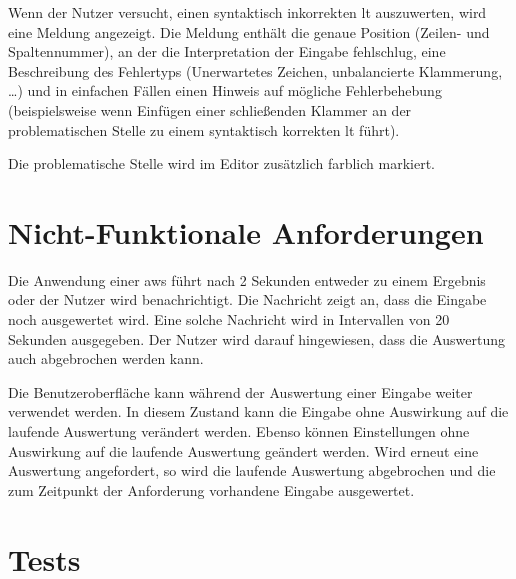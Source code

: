 \documentclass[parskip=full,11pt,twoside]{scrartcl}
\begin{document}
Wenn der Nutzer versucht, einen syntaktisch inkorrekten \gls{lt} auszuwerten,
wird eine Meldung angezeigt. Die Meldung enthält die genaue Position (Zeilen-
und Spaltennummer), an der die Interpretation der Eingabe fehlschlug, eine Beschreibung
des Fehlertyps (Unerwartetes Zeichen, unbalancierte Klammerung, \ldots) und in einfachen
Fällen einen Hinweis auf mögliche Fehlerbehebung (beispielsweise wenn Einfügen einer
schließenden Klammer an der problematischen Stelle zu einem syntaktisch korrekten
\gls{lt} führt).

Die problematische Stelle wird im Editor zusätzlich farblich markiert.


\section{Nicht-Funktionale Anforderungen}


Die Anwendung einer \gls{aws} führt nach 2 Sekunden entweder zu einem Ergebnis oder der Nutzer wird benachrichtigt.
Die Nachricht zeigt an, dass die Eingabe noch ausgewertet wird.
Eine solche Nachricht wird in Intervallen von 20 Sekunden ausgegeben.
Der Nutzer wird darauf hingewiesen, dass die Auswertung auch abgebrochen werden kann.

Die Benutzeroberfläche kann während der Auswertung einer Eingabe weiter verwendet werden.
In diesem Zustand kann die Eingabe ohne Auswirkung auf die laufende Auswertung verändert werden.
Ebenso können Einstellungen ohne Auswirkung auf die laufende Auswertung geändert werden.
Wird erneut eine Auswertung angefordert, so wird die laufende Auswertung abgebrochen und die zum Zeitpunkt der Anforderung vorhandene Eingabe ausgewertet.

\section{Tests}

\end{document}

